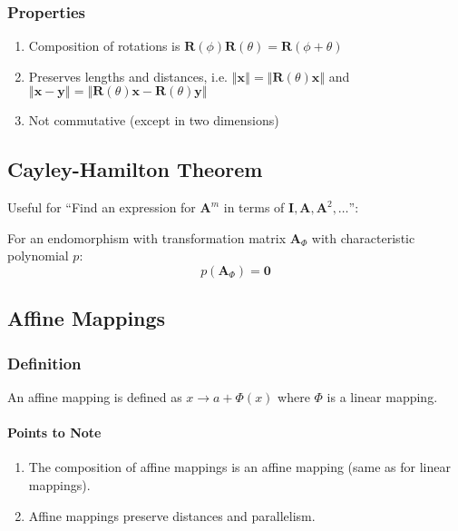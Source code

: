 \documentclass[10pt,twoside,twocolumn]{article}
\begin{document}
\subsubsection{Properties}
\begin{enumerate}
\item Composition of rotations is $\mathbf{R}\left(\phi\right)\mathbf{R}\left(\theta\right)=\mathbf{R}\left(\phi+\theta\right)$
\item Preserves lengths and distances, i.e. $\left\Vert \mathbf{x}\right\Vert =\left\Vert \mathbf{R}\left(\theta\right)\mathbf{x}\right\Vert $
and $\left\Vert \mathbf{x}-\mathbf{y}\right\Vert =\left\Vert \mathbf{R}\left(\theta\right)\mathbf{x}-\mathbf{R}\left(\theta\right)\mathbf{y}\right\Vert $
\item Not commutative (except in two dimensions)
\end{enumerate}

\subsection{Cayley-Hamilton Theorem}

Useful for ``Find an expression for $\mathbf{A}^{m}$ in terms of
$\mathbf{I},\mathbf{A},\mathbf{A}^{2},\dots$'':

For an endomorphism with transformation matrix $\mathbf{A}_{\Phi}$
with characteristic polynomial $p$: 
\[
p\left(\mathbf{A}_{\Phi}\right)=\mathbf{0}
\]



\subsection{Affine Mappings}


\subsubsection{Definition}

An affine mapping is defined as $x\rightarrow a+\Phi\left(x\right)$
where $\Phi$ is a linear mapping.


\paragraph{Points to Note}
\begin{enumerate}
\item The composition of affine mappings is an affine mapping (same as for
linear mappings). 
\item Affine mappings preserve distances and parallelism. 
\end{enumerate}
\end{document}
